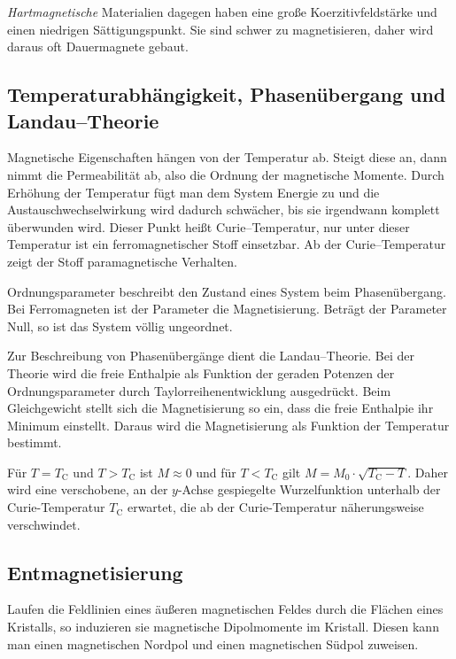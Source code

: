 \documentclass[12pt,a4paper]{scrartcl}
\numberwithin{equation}{section} %
\begin{document}
\emph{Hartmagnetische} Materialien dagegen haben eine große Koerzitivfeldstärke und einen niedrigen Sättigungspunkt. Sie sind schwer zu magnetisieren, daher wird daraus oft Dauermagnete gebaut.

\hypertarget{temperaturabhuxe4ngigkeit-phasenuxfcbergang-und-landau-theorie}{%
\subsection{Temperaturabhängigkeit, Phasenübergang und Landau--Theorie}\label{temperaturabhuxe4ngigkeit-phasenuxfcbergang-und-landau-theorie}}
Magnetische Eigenschaften hängen von der Temperatur ab. Steigt diese an, dann nimmt die Permeabilität ab, also die Ordnung der magnetische Momente. Durch Erhöhung der Temperatur fügt man dem System Energie zu und die Austauschwechselwirkung wird dadurch schwächer, bis sie irgendwann komplett überwunden wird. Dieser Punkt heißt Curie--Temperatur, nur unter dieser Temperatur ist ein ferromagnetischer Stoff einsetzbar. Ab der Curie--Temperatur zeigt der Stoff paramagnetische Verhalten.

Ordnungsparameter beschreibt den Zustand eines System beim Phasenübergang. Bei Ferromagneten ist der Parameter die Magnetisierung. Beträgt der Parameter Null, so ist das System völlig ungeordnet.

Zur Beschreibung von Phasenübergänge dient die Landau--Theorie. Bei der Theorie wird die freie Enthalpie als Funktion der geraden Potenzen der Ordnungsparameter durch Taylorreihenentwicklung ausgedrückt. Beim Gleichgewicht stellt sich die Magnetisierung so ein, dass die freie Enthalpie ihr Minimum einstellt. Daraus wird die Magnetisierung als Funktion der Temperatur bestimmt.

Für $T=T_\mathrm{C}$ und $T > T_\mathrm{C}$ ist $M\approx 0$ und für $T < T_\mathrm{C}$ gilt $M = M_0 \cdot \sqrt{T_\mathrm{C} - T}$. Daher wird eine verschobene, an der $y$-Achse gespiegelte Wurzelfunktion unterhalb der Curie-Temperatur $T_\mathrm{C}$ erwartet, die ab der Curie-Temperatur näherungsweise verschwindet.

\hypertarget{entmagnetisierung}{%
\subsection{Entmagnetisierung}\label{entmagnetisierung}}

Laufen die Feldlinien eines äußeren magnetischen Feldes durch die Flächen eines Kristalls, so induzieren sie magnetische Dipolmomente im Kristall. Diesen kann man einen magnetischen Nordpol und einen magnetischen Südpol zuweisen.
\end{document}
